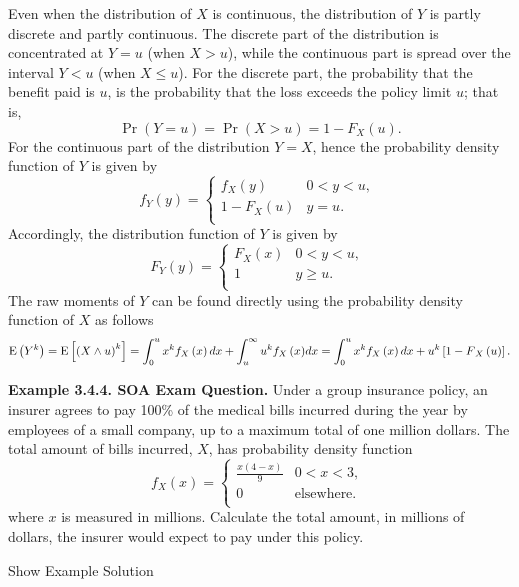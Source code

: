 \documentclass[]{book}
\theoremstyle{definition}
\theoremstyle{definition}
\theoremstyle{definition}
\theoremstyle{remark}
\begin{document}
Even when the distribution of \(X\) is continuous, the distribution of
\(Y\) is partly discrete and partly continuous. The discrete part of the
distribution is concentrated at \(Y = u\) (when \(X > u\)), while the
continuous part is spread over the interval \(Y < u\) (when
\(X \leq u\)). For the discrete part, the probability that the benefit
paid is \(u\), is the probability that the loss exceeds the policy limit
\(u\); that is,
\[\Pr \left( Y = u \right) = \Pr \left( X > u \right) = {1 - F}_{X}\left( u \right).\]
For the continuous part of the distribution \(Y = X\), hence the
probability density function of \(Y\) is given by
\[f_{Y}\left( y \right) = \left\{ \begin{matrix}
f_{X}\left( y \right) & 0 < y < u, \\
1 - F_{X}\left( u \right) & y = u. \\
\end{matrix} \right.\ \] Accordingly, the distribution function of \(Y\)
is given by \[F_{Y}\left( y \right) = \left\{ \begin{matrix}
F_{X}\left( x \right) & 0 < y < u, \\
1 & y \geq u. \\
\end{matrix} \right.\ \] The raw moments of \(Y\) can be found directly
using the probability density function of \(X\) as follows
\[\mathrm{E}\left( Y^{k} \right) = \mathrm{E}\left\lbrack \left( X \land u \right)^{k} \right\rbrack = \int_{0}^{u}x^{k}f_{X}\left( x \right)dx + \int_{u}^{\infty}{u^{k}f_{X}\left( x \right)} dx \\ = \int_{0}^{u}x^{k}f_{X}\left( x \right)dx + u^{k}\left\lbrack {1 - F}_{X}\left( u \right) \right\rbrack .\]

\textbf{Example 3.4.4. SOA Exam Question.} Under a group insurance
policy, an insurer agrees to pay 100\% of the medical bills incurred
during the year by employees of a small company, up to a maximum total
of one million dollars. The total amount of bills incurred, \(X\), has
probability density function
\[f_{X}\left( x \right) = \left\{ \begin{matrix}
\frac{x\left( 4 - x \right)}{9} & 0 < x < 3, \\
0 & \text{elsewhere.} \\
\end{matrix} \right.\ \] where \(x\) is measured in millions. Calculate
the total amount, in millions of dollars, the insurer would expect to
pay under this policy.

Show Example Solution
\end{document}
